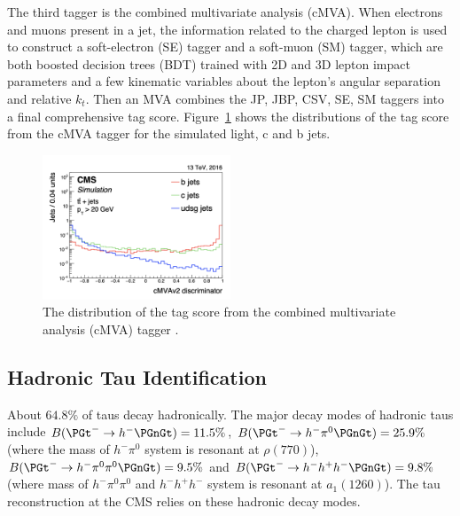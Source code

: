 The third tagger is the combined multivariate analysis (cMVA). When electrons and muons present in a jet, the information related to the charged lepton is used to construct a soft-electron (SE) tagger and a soft-muon (SM) tagger, which are both boosted decision trees (BDT) trained with 2D and 3D lepton impact parameters and a few kinematic variables about the lepton's angular separation and relative $k_t$. Then an MVA combines the JP, JBP, CSV, SE, SM taggers into a final comprehensive \PQb tag score. Figure~\ref{fig:cmsexperiment:reconstruction:cMVA} shows the distributions of the \PQb tag score from the cMVA \PQb tagger for the simulated light, c and b jets.

\begin{figure}[ht]
    \centering
    \includegraphics[width=0.5\textwidth]{chapters/CMSExperiment/sectionReconstruction/figures/cMVA}
    \caption{The distribution of the \PQb tag score from the combined multivariate analysis (cMVA) \PQb tagger \cite{Sirunyan:2017ezt}. }
    \label{fig:cmsexperiment:reconstruction:cMVA}
\end{figure}





\subsection{Hadronic Tau Identification}

About $64.8\%$ of taus decay hadronically. The major decay modes of hadronic taus include $B(\PGt^- \to h^- \PGnGt)=11.5\% $, $B(\PGt^- \to h^- \pi^0 \PGnGt)=25.9\% $ (where the mass of $h^-\pi^0$ system is resonant at $\rho(770)$), $B(\PGt^- \to h^- \pi^0 \pi^0 \PGnGt)=9.5\% $ and $B(\PGt^- \to h^- h^+ h^- \PGnGt)=9.8\% $ (where mass of $h^- \pi^0 \pi^0$ and $h^- h^+ h^- $ system is resonant at $a_1(1260)$). The tau reconstruction at the CMS relies on these hadronic decay modes.

